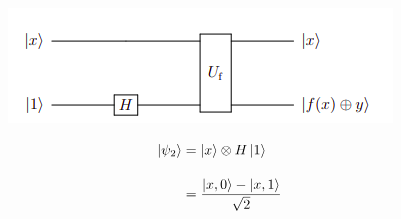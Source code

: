 \begin{figure}[h]
    \centering
    \includegraphics{QuantumAlgorithms/images/Deutsch2Bit2.png}
    \label{Deutsh2Bits2}
\end{figure}

\begin{align*}
    \ket{\psi_2} &= \ket{x} \otimes H\ket{1} \\[10pt]
                 &= \frac{\ket{x,0} - \ket{x,1}}{\sqrt{2}}
\end{align*}

\newpage
